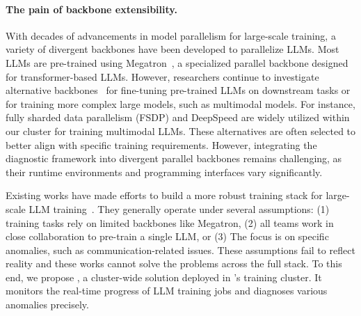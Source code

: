 \paragraph{The pain of backbone extensibility.}
With decades of advancements in model parallelism for large-scale training, a variety of divergent backbones have been developed to parallelize LLMs.
Most LLMs are pre-trained using Megatron~\cite{shoeybiMegatronLMTraining}, a specialized parallel backbone designed for transformer-based LLMs. However, researchers continue to investigate alternative backbones~\cite{zhaoPyTorchFSDP,rajbhandariZeROMemory,liangTorchTitanOnestop} for fine-tuning pre-trained LLMs on downstream tasks or for training more complex large models, such as multimodal models.
For instance, fully sharded data parallelism (FSDP)\cite{zhaoPyTorchFSDP} and DeepSpeed\cite{rajbhandariZeROMemory} are widely utilized within our cluster for training multimodal LLMs. These alternatives are often selected to better align with specific training requirements.
However, integrating the diagnostic framework into divergent parallel backbones remains challenging, as their runtime environments and programming interfaces vary significantly.


Existing works have made efforts to build a more robust training stack for large-scale LLM training~\cite{jiangMegaScaleScaling,dongBoostingLargescale}.
They generally operate under several assumptions:
(1) training tasks rely on limited backbones like Megatron,
(2) all teams work in close collaboration to pre-train a single LLM,
or (3) The focus is on specific anomalies, such as communication-related issues.
These assumptions fail to reflect reality and these works cannot solve the problems across the full stack. To this end, we propose \sysname{}, a cluster-wide solution deployed in \groupname{}’s training cluster.
It monitors the real-time progress of LLM training jobs and diagnoses various anomalies precisely.

